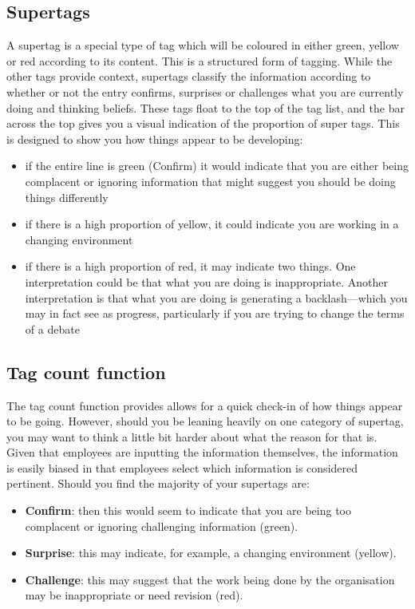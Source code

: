 \documentclass[letterpaper,10pt,english]{sphinxmanual}
\begin{document}
\subsection{Supertags}
\label{user-guide:supertags}
A supertag is a special type of tag which will be coloured in either
green, yellow or red according to its content. This is a structured
form of tagging. While the other tags provide context, supertags
classify the information according to whether or not the entry
confirms, surprises or challenges what you are currently doing and
thinking beliefs. These tags float to the top of the tag list, and the
bar across the top gives you a visual indication of the proportion of
super tags.  This is designed to show you how things appear to be
developing:
\begin{itemize}
\item {} 
if the entire line is green (Confirm) it would indicate that you are either being complacent or ignoring information that might suggest you should be doing things differently

\item {} 
if there is a high proportion of yellow, it could indicate you are working in a changing environment

\item {} 
if there is a high proportion of red, it may indicate two things. One interpretation could be that what you are doing is inappropriate.  Another interpretation is that what you are doing is generating a backlash—which you may in fact see as progress, particularly if you are trying to change the terms of a debate

\end{itemize}


\subsection{Tag count function}
\label{user-guide:tag-count-function}
The tag count function provides allows for a quick check-in of how
things appear to be going. However, should you be leaning heavily on
one category of supertag, you may want to think a little bit harder
about what the reason for that is. Given that employees are inputting
the information themselves, the information is easily biased in that
employees select which information is considered pertinent. Should you
find the majority of your supertags are:
\begin{itemize}
\item {} 
\textbf{Confirm}: then this would seem to indicate that you are being too complacent or ignoring challenging information (green).

\item {} 
\textbf{Surprise}: this may indicate, for example, a changing environment (yellow).

\item {} 
\textbf{Challenge}: this may suggest that the work being done by the organisation may be inappropriate or need revision (red).

\end{itemize}
\end{document}
